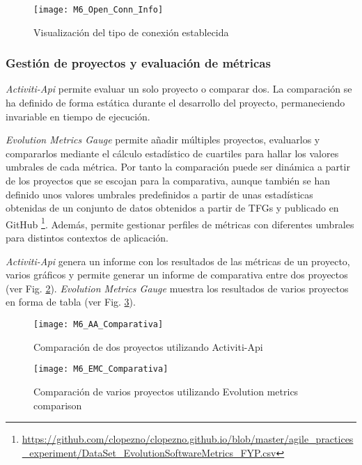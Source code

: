 \begin{figure}[!h]
	\centering
	\texttt{[image: M6\_Open\_Conn\_Info]}
	\caption{Visualización del tipo de conexión establecida}\label{fig:M6_Open_Conn_Info}
\end{figure}
\FloatBarrier

\subsubsection{Gestión de proyectos y evaluación de métricas}

\textit{Activiti-Api} permite evaluar un solo proyecto o comparar dos. La comparación se ha definido de forma estática durante el desarrollo del proyecto, permaneciendo invariable en tiempo de ejecución.

\textit{Evolution Metrics Gauge} permite añadir múltiples proyectos, evaluarlos y compararlos mediante el cálculo estadístico de cuartiles para hallar los valores umbrales de cada métrica. Por tanto la comparación puede ser dinámica a partir de los proyectos que se escojan para la comparativa, aunque también se han definido unos valores umbrales predefinidos a partir de unas estadísticas obtenidas de un conjunto de datos obtenidos a partir de TFGs y publicado en GitHub \footnote{\url{https://github.com/clopezno/clopezno.github.io/blob/master/agile_practices_experiment/DataSet_EvolutionSoftwareMetrics_FYP.csv}}. Además, permite gestionar perfiles de métricas con diferentes umbrales para distintos contextos de aplicación.

\textit{Activiti-Api} genera un informe con los resultados de las métricas de un proyecto, varios gráficos y permite generar un informe de comparativa entre dos proyectos (ver Fig. \ref{fig:M6_AA_Comparativa}). \textit{Evolution Metrics Gauge} muestra los resultados de varios proyectos en forma de tabla (ver Fig. \ref{fig:M6_EMC_Comparativa}).

\begin{figure}[!h]
	\centering
	\texttt{[image: M6\_AA\_Comparativa]}
	\caption{Comparación de dos proyectos utilizando Activiti-Api}\label{fig:M6_AA_Comparativa}
\end{figure}
\FloatBarrier

\begin{figure}[!h]
	\centering
	\texttt{[image: M6\_EMC\_Comparativa]}
	\caption{Comparación de varios proyectos utilizando Evolution metrics comparison}\label{fig:M6_EMC_Comparativa}
\end{figure}
\FloatBarrier

